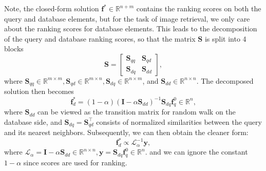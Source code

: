 \documentclass[letterpaper]{article} \usepackage{aaai19}  \usepackage{times}  \usepackage{helvet}  \usepackage{courier}  \usepackage{url}  \usepackage{graphicx}  \frenchspacing  \setlength{\pdfpagewidth}{8.5in}  \setlength{\pdfpageheight}{11in}
\begin{document}
Note, the closed-form solution $\mathbf{f}^*\in\mathbb{R}^{n+m}$ contains the ranking scores on both the query and database elements,
but for the task of image retrieval, we only care about the ranking scores for database elements.
This leads to the decomposition of the query and database ranking scores,
so that the matrix $\mathbf{S}$ is split into 4 blocks
\begin{equation}
  \mathbf{S} = \begin{bmatrix}
      \mathbf{S}_{qq} & \mathbf{S}_{qd} \\
      \mathbf{S}_{dq} & \mathbf{S}_{dd}
  \end{bmatrix},
\end{equation}
where $\mathbf{S}_{qq}\in\mathbb{R}^{m\times m},\mathbf{S}_{qd}\in\mathbb{R}^{m\times n},\mathbf{S}_{dq}\in\mathbb{R}^{n\times m}$, and $\mathbf{S}_{dd}\in\mathbb{R}^{n\times n}$.
The decomposed solution then becomes
\begin{equation}
\mathbf{f}_d^*=(1-\alpha)(\mathbf{I}-\alpha\mathbf{S}_{dd})^{-1}\mathbf{S}_{dq}\mathbf{f}_q^0 \in \mathbb{R}^n,
\end{equation}
where $\mathbf{S}_{dd}$ can be viewed as the transition matrix for random walk on the database side, and $\mathbf{S}_{dq}=\mathbf{S}_{qd}^\top$ consists of normalized similarities between the query and its nearest neighbors.
Subsequently, we can then obtain the cleaner form:
\begin{equation}
\label{equ:clean_form}
\mathbf{f}_d^* \propto \mathcal{L}_\alpha^{-1} \mathbf{y},
\end{equation}
where $\mathcal{L}_\alpha = \mathbf{I} - \alpha \mathbf{S}_{dd}\in\mathbb{R}^{n\times n}, \mathbf{y} = \mathbf{S}_{dq}\mathbf{f}_q^0\in\mathbb{R}^n$.
and we can ignore the constant $1-\alpha$ since scores are used for ranking.
\end{document}
